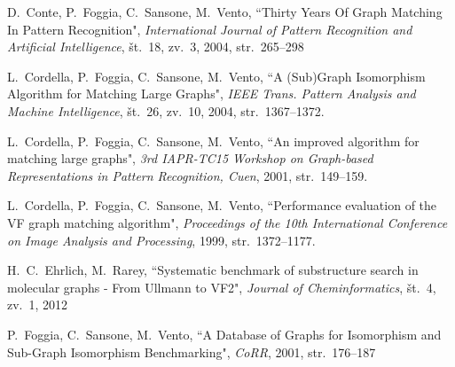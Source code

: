 \documentclass[a4paper, 12pt, ]{book}
\begin{document}
\begin{thebibliography}{99}



	 D.~Conte, P.~Foggia, C.~Sansone, M.~Vento, ``Thirty Years Of Graph Matching In Pattern Recognition",
		\textit{International Journal of Pattern Recognition and Artificial Intelligence}, št.~18, zv.~3, 2004, str.~265--298

	 L.~Cordella, P.~Foggia, C.~Sansone, M.~Vento, ``A (Sub)Graph Isomorphism Algorithm for Matching Large Graphs",
		\textit {IEEE Trans. Pattern Analysis and Machine Intelligence}, št.~26, zv.~10, 2004, str.~1367--1372.
		
	 L.~Cordella, P.~Foggia, C.~Sansone, M.~Vento, ``An improved algorithm for matching large graphs",
		\textit {3rd IAPR-TC15 Workshop on Graph-based Representations in Pattern Recognition, Cuen}, 2001, str.~149--159.
		
	 L.~Cordella, P.~Foggia, C.~Sansone, M.~Vento, ``Performance evaluation of the VF graph matching algorithm",
		\textit {Proceedings of the 10th International Conference on Image Analysis and Processing}, 1999, str.~1372--1177.

	 H.~C.~Ehrlich, M.~Rarey, ``Systematic benchmark of substructure search in molecular graphs - From Ullmann to VF2",
		\textit{Journal of Cheminformatics}, št.~4, zv.~1, 2012

	 P.~Foggia, C.~Sansone, M.~Vento, ``A Database of Graphs for Isomorphism and Sub-Graph Isomorphism Benchmarking",
		\textit{CoRR}, 2001, str.~176--187
		

\end{thebibliography}
\end{document}
